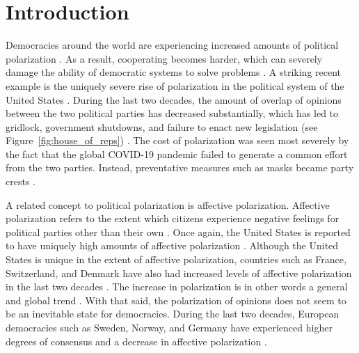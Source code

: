 \documentclass[11pt]{article}
\begin{document}
\newpage
\tableofcontents
\newpage

\part{Introduction}
\label{introduction}
Democracies around the world are experiencing increased amounts of political polarization \cite{boxell_cross-country_2020,mccoy_polarization_2018, somer_deja_2018}. 
As a result, cooperating becomes harder, which can severely damage the ability of democratic systems to solve problems \cite{andris_rise_2015,levin_dynamics_2021,mccoy_polarization_2018}. 
A striking recent example is the uniquely severe rise of polarization in the political system of the United States \cite{dimock_america_2020}. 
During the last two decades, the amount of overlap of opinions between the two political parties has decreased substantially, which has led to gridlock, government shutdowns, and failure to enact new legislation (see Figure~\ref{fig:house_of_reps}) \cite{andris_rise_2015, pew_research_center_political_2014-1}. The cost of polarization was seen most severely by the fact that the global COVID-19 pandemic failed to generate a common effort from the two parties. Instead, preventative measures such as masks became party crests \cite{macy2021polarization}.

A related concept to political polarization is affective polarization. Affective polarization refers to the extent which citizens experience negative feelings for political parties other than their own \cite{boxell_cross-country_2020, iyengar_origins_2019}. 
Once again, the United States is reported to have uniquely high amounts of affective polarization \cite{boxell_cross-country_2020}. 
Although the United States is unique in the extent of affective polarization, countries such as France, Switzerland, and Denmark have also had increased levels of affective polarization in the last two decades \cite{boxell_cross-country_2020}. 
The increase in polarization is in other words a general and global trend \cite{mccoy_polarization_2018, somer_deja_2018, wilson_polarization_2020}. 
With that said, the polarization of opinions does not seem to be an inevitable state for democracies. 
During the last two decades, European democracies such as Sweden, Norway, and Germany have experienced higher degrees of consensus and a decrease in affective polarization \cite{boxell_cross-country_2020}. 
\end{document}
